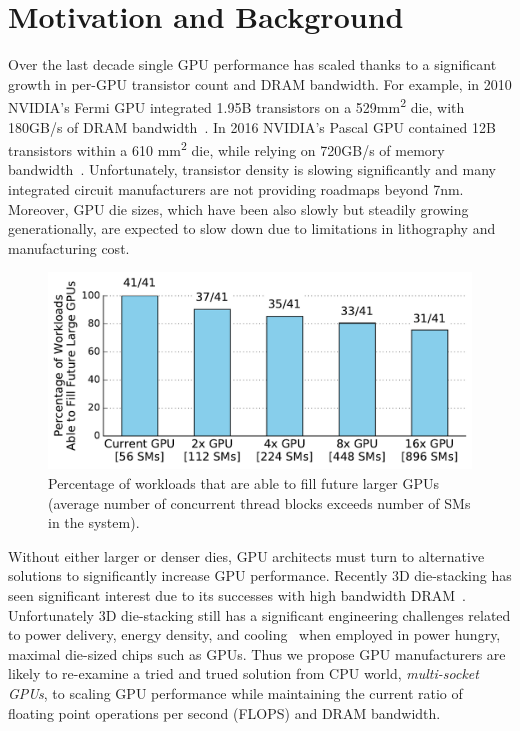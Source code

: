 \section{Motivation and Background}
\label{sec:background}

Over the last decade single GPU performance has scaled thanks to a 
significant growth in per-GPU transistor count and DRAM bandwidth. For 
example, in 2010 NVIDIA's Fermi GPU integrated 1.95B transistors on a 
529mm\textsuperscript{2} die, with 180GB/s of DRAM 
bandwidth~\cite{patterson2011computer}. In 2016 NVIDIA's Pascal GPU 
contained 12B transistors within a 610 mm\textsuperscript{2} die, while 
relying on 720GB/s of memory bandwidth~\cite{inside-pascal}. Unfortunately, 
transistor density is slowing significantly and many integrated circuit 
manufacturers are not providing roadmaps beyond 7nm. Moreover, GPU die sizes,
which have been also slowly but steadily growing generationally, are 
expected to slow down due to limitations in lithography and manufacturing cost.

\begin{figure}[t] 
    \centering
    \includegraphics[width=1.0\columnwidth]{figures/plot_ctas_per_sm.pdf}
    \caption{Percentage of workloads that are able to fill future larger GPUs 
    (average number of concurrent thread blocks exceeds number of SMs in the system).}
    \label{fig:ctas}
    \vspace{-.2in}
\end{figure}

Without either larger or denser dies, GPU architects must turn to 
alternative solutions to significantly increase GPU performance.  Recently 3D 
die-stacking has seen significant interest due to its successes with high 
bandwidth DRAM~\cite{HBM}. Unfortunately 3D die-stacking still has 
a significant engineering challenges related to power delivery, 
energy density, and cooling~\cite{verbree2010cost} when employed in power 
hungry, maximal die-sized chips such as GPUs. Thus we propose GPU manufacturers 
are likely to re-examine a tried and trued solution from CPU world, 
\textit{multi-socket GPUs}, to scaling GPU performance while maintaining the 
current ratio of floating point operations per second (FLOPS) and DRAM 
bandwidth.

